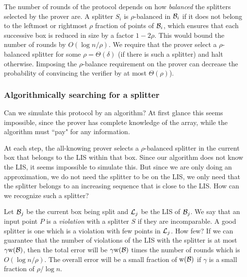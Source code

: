 \documentclass{acmsmall}
\newcommand{\cB}{{\cal B}}
\newcommand{\cL}{{\cal L}}
\newcommand{\width}{{\bf {\rm  w}}}
\begin{document}
 
The number of rounds of the protocol depends on how \emph{balanced} the splitters
selected by the prover are.   A splitter $S_i$ is $\rho$-balanced in $\cB_i$ if
it does not belong to the leftmost or rightmost $\rho$ fraction of points of $\cB_i$,
which ensures that each successive box is reduced in size by a factor $1-2\rho$. This would bound the number of rounds
by $O(\log n/\rho)$.  We require that the prover select a $\rho$-balanced splitter for some $\rho=\Theta(\delta)$ (if there
is such a splitter) and halt otherwise.  Iimposing the $\rho$-balance requirement on the prover can decrease the probability
of convincing the verifier by at most $\Theta(\rho)$).

\subsubsection*{Algorithmically searching for a splitter}


Can we  simulate this protocol by an algorithm?  At first glance this seems impossible, since the prover has complete knowledge
 of the array, while the algorithm must ``pay" for any information.

At each step, the all-knowing prover selects a $\rho$-balanced splitter in the current box that belongs to the LIS within that box.
Since our algorithm does not know the LIS, it seems impossible to simulate this.  But since we are only
doing an approximation, we do not need the splitter to be on the LIS, we only need that the splitter
belongs to an increasing sequence that is close to the LIS.  How can we recognize such a splitter?

%
Let $\cB_j$ be the current box being split and $\cL_j$ be the LIS of $\cB_j$.
We say that an input point $P$ is a \emph{violation} with a splitter $S$
if they are incomparable. A good splitter is one which is a violation
with few points in $\cL_j$.
%
How few?  If
we can guarantee that the number of violations of the LIS with the splitter
is at most $\gamma \width(\cB)$, then the total error will be $\gamma \width(\cB)$ times the number
of rounds which is $O(\log n/\rho)$.  The overall error will be a small fraction of $\width(\cB)$ if 
$\gamma$ is a small fraction of $\rho/\log n$.
\end{document}
